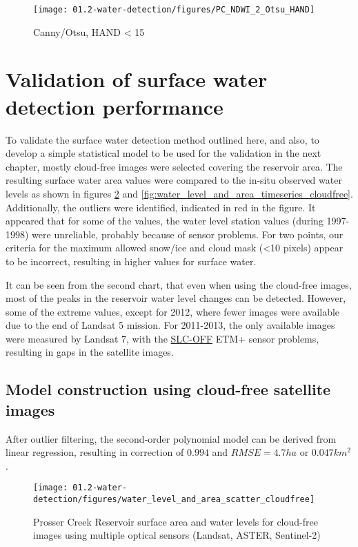 \begin{figure}[H]
	\centering
	\texttt{[image: 01.2-water-detection/figures/PC\_NDWI\_2\_Otsu\_HAND]}
	\caption{Canny/Otsu, HAND < 15}
	\label{fig:r1_canny_otsu_hand}
\end{figure}

\section{Validation of surface water detection performance}

To validate the surface water detection method outlined here, and also, to develop a simple statistical model to be used for the validation in the next chapter, mostly cloud-free images were selected covering the reservoir area. The resulting surface water area values were compared to the in-situ observed water levels as shown in figures \ref{fig:scatter_fit} and \ref{fig:water_level_and_area_timeseries_cloudfree}. Additionally, the outliers were identified, indicated in red in the figure. It appeared that for some of the values, the water level station values (during 1997-1998) were unreliable, probably because of sensor problems. For two points, our criteria for the maximum allowed snow/ice and cloud mask (<10 pixels) appear to be incorrect, resulting in higher values for surface water.

It can be seen from the second chart, that even when using the cloud-free images, most of the peaks in the reservoir water level changes can be detected. However, some of the extreme values, except for 2012, where fewer images were available due to the end of Landsat 5 mission. For 2011-2013, the only available images were measured by Landsat 7, with the \href{https://landsat.usgs.gov/slc-products-background}{SLC-OFF} ETM+ sensor problems, resulting in gaps in the satellite images.

\subsection{Model construction using cloud-free satellite images}

After outlier filtering, the second-order polynomial model can be derived from linear regression, resulting in correction of $0.994$ and $RMSE = 4.7ha$ or $0.047km^2$.

\begin{figure}[H]
	\centering
	\texttt{[image: 01.2-water-detection/figures/water\_level\_and\_area\_scatter\_cloudfree]}
	\caption{Prosser Creek Reservoir surface area and water levels for cloud-free images using multiple optical sensors (Landsat, ASTER, Sentinel-2)}
	\label{fig:scatter_fit}
\end{figure}

